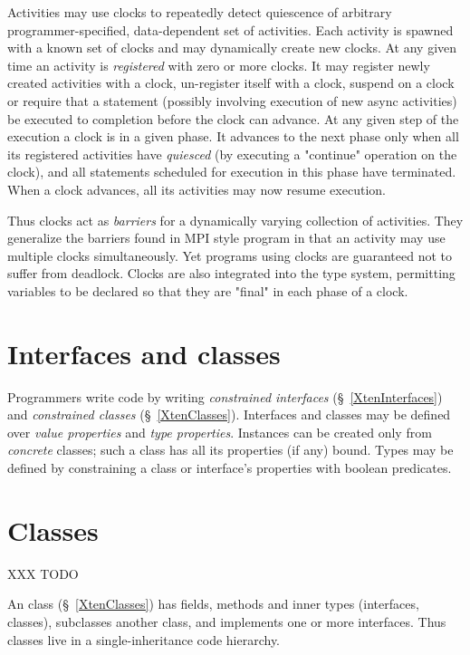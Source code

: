 Activities may use clocks to repeatedly detect quiescence of arbitrary
programmer-specified, data-dependent set of activities. Each activity
is spawned with a known set of clocks and may dynamically create new
clocks. At any given time an activity is \emph{registered} with zero or
more clocks. It may register newly created activities with a clock,
un-register itself with a clock, suspend on a clock or require that a
statement (possibly involving execution of new async activities) be
executed to completion before the clock can advance.  At any given
step of the execution a clock is in a given phase. It advances to the
next phase only when all its registered activities have \emph{quiesced}
(by executing a \xcd"continue" operation on the clock), and all
statements scheduled for execution in this phase have terminated.
When a clock advances, all its activities may now resume execution.

Thus clocks act as \emph{barriers} for a dynamically varying collection
of activities. They generalize the barriers found in MPI style program
in that an activity may use multiple clocks simultaneously. Yet
programs using clocks are guaranteed not to suffer from
deadlock. Clocks are also integrated into the \Xten{} type system,
permitting variables to be declared so that they are \xcd"final" in each
phase of a clock.

\section{Interfaces and classes}
Programmers write \Xten{} code by writing \emph{constrained interfaces}
(\S~\ref{XtenInterfaces}) and \emph{constrained classes}
(\S~\ref{XtenClasses}). Interfaces and classes may be
defined over \emph{value properties} and \emph{type properties}.
Instances can be
created only from \emph{concrete} classes; such a class has all its
properties (if any) bound.  Types may be defined by constraining a class or interface's properties with boolean predicates.

\section{Classes}

XXX TODO

An \Xten{} class (\S~\ref{XtenClasses}) has fields, methods and
inner types (interfaces, classes), subclasses another class, and
implements one or more interfaces. Thus \Xten{} classes live in a
single-inheritance code hierarchy.  

